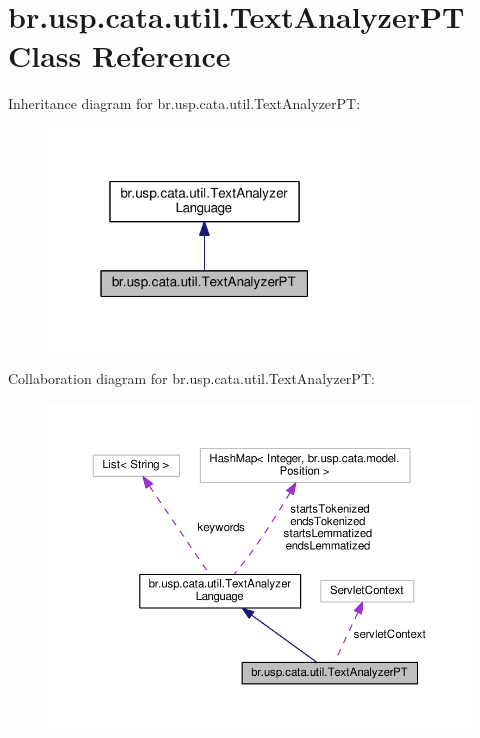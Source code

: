 \hypertarget{classbr_1_1usp_1_1cata_1_1util_1_1_text_analyzer_p_t}{\section{br.\+usp.\+cata.\+util.\+Text\+Analyzer\+P\+T Class Reference}
\label{classbr_1_1usp_1_1cata_1_1util_1_1_text_analyzer_p_t}
}


Inheritance diagram for br.\+usp.\+cata.\+util.\+Text\+Analyzer\+P\+T\+:\nopagebreak
\begin{figure}[H]
\begin{center}
\leavevmode
\includegraphics[width=235pt]{classbr_1_1usp_1_1cata_1_1util_1_1_text_analyzer_p_t__inherit__graph}
\end{center}
\end{figure}


Collaboration diagram for br.\+usp.\+cata.\+util.\+Text\+Analyzer\+P\+T\+:\nopagebreak
\begin{figure}[H]
\begin{center}
\leavevmode
\includegraphics[width=350pt]{classbr_1_1usp_1_1cata_1_1util_1_1_text_analyzer_p_t__coll__graph}
\end{center}
\end{figure}

